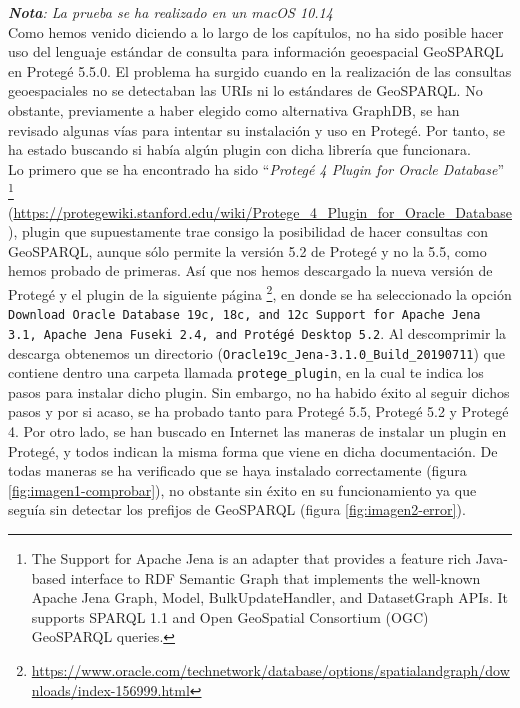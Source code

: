 \label{ch:ApendiceB}

\textit{\textbf{Nota}: La prueba se ha realizado en un macOS 10.14}\\

Como hemos venido diciendo a lo largo de los capítulos, no ha sido posible hacer uso del lenguaje estándar de consulta para información geoespacial GeoSPARQL en Protegé 5.5.0. El problema ha surgido cuando en la realización de las consultas geoespaciales no se detectaban las URIs ni lo estándares de GeoSPARQL. No obstante, previamente a haber elegido como alternativa GraphDB, se han revisado algunas vías para intentar su instalación y uso en Protegé. Por tanto, se ha estado buscando si había algún plugin con dicha librería que funcionara. \\

Lo primero que se ha encontrado ha sido ``\textit{Protegé 4 Plugin for Oracle Database}'' \footnote{The Support for Apache Jena is an adapter that provides a feature rich Java-based interface to RDF Semantic Graph that implements the well-known Apache Jena Graph, Model, BulkUpdateHandler, and DatasetGraph APIs. It supports SPARQL 1.1 and Open GeoSpatial Consortium (OGC) GeoSPARQL queries.} (\url{https://protegewiki.stanford.edu/wiki/Protege_4_Plugin_for_Oracle_Database}), plugin que supuestamente trae consigo la posibilidad de hacer consultas con GeoSPARQL, aunque sólo permite la versión 5.2 de Protegé y no la 5.5, como hemos probado de primeras. Así que nos hemos descargado la nueva versión de Protegé y el plugin de la siguiente página \footnote{\url{https://www.oracle.com/technetwork/database/options/spatialandgraph/downloads/index-156999.html}}, en donde se ha seleccionado la opción \texttt{Download Oracle Database 19c, 18c, and 12c Support for Apache Jena 3.1, Apache Jena Fuseki 2.4, and Protégé Desktop 5.2}. Al descomprimir la descarga obtenemos un directorio (\texttt{Oracle19c\_Jena-3.1.0\_Build\_20190711}) que contiene dentro una carpeta llamada \texttt{protege\_plugin}, en la cual te indica los pasos para instalar dicho plugin. Sin embargo, no ha habido éxito al seguir dichos pasos y por si acaso, se ha probado tanto para Protegé 5.5, Protegé 5.2 y Protegé 4. Por otro lado, se han buscado en Internet las maneras de instalar un plugin en Protegé, y todos indican la misma forma que viene en dicha documentación. De todas maneras se ha verificado que se haya instalado correctamente (figura \ref{fig:imagen1-comprobar}), no obstante sin éxito en su funcionamiento ya que seguía sin detectar los prefijos de GeoSPARQL (figura \ref{fig:imagen2-error}).

